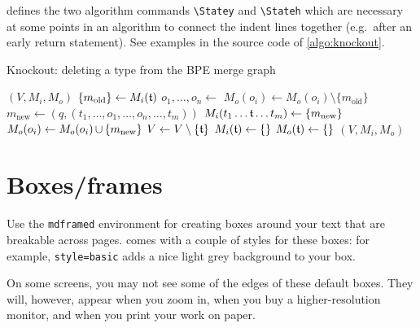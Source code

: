 \repo defines the two algorithm commands \verb|\Statey| and \verb|\Stateh| which are necessary at some points in an algorithm to connect the indent lines together (e.g.\ after an early return statement). See examples in the source code of \autoref{algo:knockout}.
\begin{algorithm}[H]
	\caption{Knockout: deleting a type from the BPE merge graph}
	\label{algo:knockout}
	\begin{algorithmic}[1]
			 
				\State\Return $(V, M_i, M_o)$
			\EndIf
			\Statey $\{m_\text{old}\} \gets M_i(\mathfrak{t})$
			\State $o_1,\hdots, o_n \gets$ 
				\State $M_o(o_i) \gets M_o(o_i) \setminus \{m_\text{old}\}$  
			\EndFor \vspace{-0.22em}
				\State $m_\text{new} \gets (q, (t_1,\hdots, o_1, \hdots, o_n, \hdots, t_m))$
				\State $M_i(t_1\hdots \mathfrak{t} \hdots t_m) \gets \{m_\text{new}\}$  
					\State $M_o(o_i) \gets M_o(o_i) \operatorname{\cup}\, \{m_\text{new}\}$  
				\EndFor
			\EndFor
			\Statey $V \gets V \setminus \{\mathfrak{t}\}$
			\State $M_i(\mathfrak{t}) \gets \{\}$
			\State $M_o(\mathfrak{t}) \gets \{\}$
			\State \Return $(V, M_i, M_o)$
		\EndFunction
	\end{algorithmic}
\end{algorithm}


\section{Boxes/frames}
Use the \verb|mdframed| environment for creating boxes around your text that are breakable across pages. \repo comes with a couple of styles for these boxes: for example, \verb|style=basic| adds a nice light grey background to your box.

\begin{mdframed}[frametitle={A note about screens}, style=basic,  innertopmargin=0.7em]
	On some screens, you may not see some of the edges of these default boxes. They will, however, appear when you zoom in, when you buy a higher-resolution monitor, and when you print your work on paper.
\end{mdframed}


